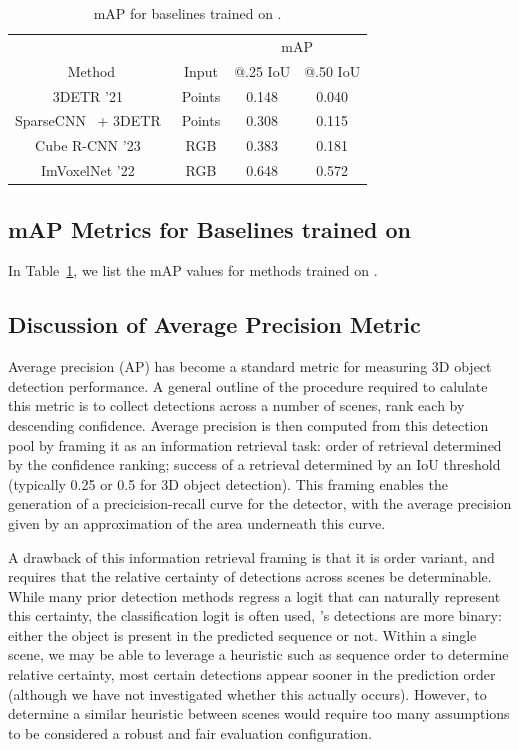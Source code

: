 \begin{table}[h]
\centering
    \caption{mAP for baselines trained on \DatasetName.}
    \begin{tabular}{c|c|cc}
        & & \multicolumn{2}{c}{mAP} \\
         Method & Input & @.25 IoU & @.50 IoU \\
        \hline \hline
        3DETR '21~\cite{misra2021end} & Points & 0.148 & 0.040 \\
        SparseCNN~\cite{tang2022torchsparse} + 3DETR~\cite{misra2021end} & Points & 0.308 & 0.115 \\
        Cube R-CNN '23~\cite{brazil2023omni3d} & RGB & 0.383 & 0.181 \\
        ImVoxelNet '22~\cite{rukhovich2022imvoxelnet} & RGB & 0.648 & 0.572\\
    \end{tabular}
    \label{tab:baseline_map}
\end{table}

\subsection{mAP Metrics for Baselines trained on \DatasetName{}}
\label{app:baseline_map}

In Table~\ref{tab:baseline_map}, we list the mAP values for methods trained on \DatasetName{}.



\subsection{Discussion of Average Precision Metric}
Average precision (AP) has become a standard metric for measuring 3D object detection performance. A general outline of the procedure required to calulate this metric is to collect detections across a number of scenes, rank each by descending confidence. Average precision is then computed from this detection pool by framing it as an information retrieval task: order of retrieval determined by the confidence ranking; success of a retrieval determined by an IoU threshold (typically 0.25 or 0.5 for 3D object detection). This framing enables the generation of a precicision-recall curve for the detector, with the average precision given by an approximation of the area underneath this curve.

A drawback of this information retrieval framing is that it is order variant, and requires that the relative certainty of detections across scenes be determinable. While many prior detection methods regress a logit that can naturally represent this certainty, \eg the classification logit is often used, \METHOD{}'s detections are more binary: either the object is present in the predicted sequence or not. Within a single scene, we may be able to leverage a heuristic such as sequence order to determine relative certainty, \ie most certain detections appear sooner in the prediction order (although we have not investigated whether this actually occurs). However, to determine a similar heuristic between scenes would require too many assumptions to be considered a robust and fair evaluation configuration.

